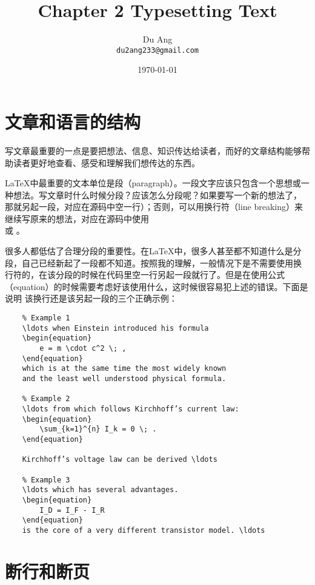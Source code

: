 \documentclass[UTF8]{ctexart}
\title{\heiti Chapter 2 Typesetting Text}
\author{\kaishu Du Ang \\ \texttt{du2ang233@gmail.com} }
\date{\today}
\begin{document}
\maketitle

\section{文章和语言的结构}
写文章最重要的一点是要把想法、信息、知识传达给读者，而好的文章结构能够帮助读者更好地查看、感受和理解我们想传达的东西。

\LaTeX 中最重要的文本单位是段（paragraph）。一段文字应该只包含一个思想或一种想法。写文章时什么时候分段？应该怎么分段呢？如果要写一个新的想法了，
那就另起一段，对应在源码中空一行）；否则，可以用换行符（line breaking）来继续写原来的想法，对应在源码中使用
\texttt{\\} 或 \texttt{\newline}。

很多人都低估了合理分段的重要性。在\LaTeX 中，很多人甚至都不知道什么是分段，自己已经新起了一段都不知道。按照我的理解，一般情况下是不需要使用换
行符的，在该分段的时候在代码里空一行另起一段就行了。但是在使用公式（equation）的时候需要考虑好该使用什么，这时候很容易犯上述的错误。下面是说明
该换行还是该另起一段的三个正确示例：
\begin{verbatim}
    % Example 1
    \ldots when Einstein introduced his formula
    \begin{equation}
        e = m \cdot c^2 \; ,
    \end{equation}
    which is at the same time the most widely known
    and the least well understood physical formula.

    % Example 2
    \ldots from which follows Kirchhoff’s current law:
    \begin{equation}
        \sum_{k=1}^{n} I_k = 0 \; .
    \end{equation}

    Kirchhoff’s voltage law can be derived \ldots

    % Example 3
    \ldots which has several advantages.
    \begin{equation}
        I_D = I_F - I_R
    \end{equation}
    is the core of a very different transistor model. \ldots
\end{verbatim}

\section{断行和断页}
\end{document}
